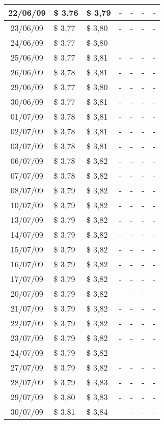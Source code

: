 \begin{center}
\begin{longtable}{|c|p{1.5cm}|p{1.5cm}|p{1.5cm}|p{1.5cm}|p{1.5cm}|p{1.5cm}|}
22/06/09 & \$ 3,76 & \$ 3,79 & - & - & - & - \\ \hline
23/06/09 & \$ 3,77 & \$ 3,80 & - & - & - & - \\ \hline
24/06/09 & \$ 3,77 & \$ 3,80 & - & - & - & - \\ \hline
25/06/09 & \$ 3,77 & \$ 3,81 & - & - & - & - \\ \hline
26/06/09 & \$ 3,78 & \$ 3,81 & - & - & - & - \\ \hline
29/06/09 & \$ 3,77 & \$ 3,80 & - & - & - & - \\ \hline
30/06/09 & \$ 3,77 & \$ 3,81 & - & - & - & - \\ \hline
01/07/09 & \$ 3,78 & \$ 3,81 & - & - & - & - \\ \hline
02/07/09 & \$ 3,78 & \$ 3,81 & - & - & - & - \\ \hline
03/07/09 & \$ 3,78 & \$ 3,81 & - & - & - & - \\ \hline
06/07/09 & \$ 3,78 & \$ 3,82 & - & - & - & - \\ \hline
07/07/09 & \$ 3,78 & \$ 3,82 & - & - & - & - \\ \hline
08/07/09 & \$ 3,79 & \$ 3,82 & - & - & - & - \\ \hline
10/07/09 & \$ 3,79 & \$ 3,82 & - & - & - & - \\ \hline
13/07/09 & \$ 3,79 & \$ 3,82 & - & - & - & - \\ \hline
14/07/09 & \$ 3,79 & \$ 3,82 & - & - & - & - \\ \hline
15/07/09 & \$ 3,79 & \$ 3,82 & - & - & - & - \\ \hline
16/07/09 & \$ 3,79 & \$ 3,82 & - & - & - & - \\ \hline
17/07/09 & \$ 3,79 & \$ 3,82 & - & - & - & - \\ \hline
20/07/09 & \$ 3,79 & \$ 3,82 & - & - & - & - \\ \hline
21/07/09 & \$ 3,79 & \$ 3,82 & - & - & - & - \\ \hline
22/07/09 & \$ 3,79 & \$ 3,82 & - & - & - & - \\ \hline
23/07/09 & \$ 3,79 & \$ 3,82 & - & - & - & - \\ \hline
24/07/09 & \$ 3,79 & \$ 3,82 & - & - & - & - \\ \hline
27/07/09 & \$ 3,79 & \$ 3,82 & - & - & - & - \\ \hline
28/07/09 & \$ 3,79 & \$ 3,83 & - & - & - & - \\ \hline
29/07/09 & \$ 3,80 & \$ 3,83 & - & - & - & - \\ \hline
30/07/09 & \$ 3,81 & \$ 3,84 & - & - & - & - \\ \hline

\end{longtable}
\end{center}
